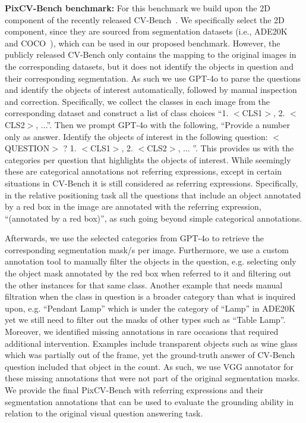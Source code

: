 \textbf{PixCV-Bench benchmark:} For this benchmark we build upon the 2D component of the recently released CV-Bench~\cite{tong2024cambrian}. We specifically select the 2D component, since they are sourced from segmentation datasets (i.e., ADE20K~\cite{zhou2017scene} and COCO~\cite{lin2014microsoft}), which can be used in our proposed benchmark. However, the publicly released CV-Bench only contains the mapping to the original images in the corresponding datasets, but it does not identify the objects in question and their corresponding segmentation. As such we use GPT-4o to parse the questions and identify the objects of interest automatically, followed by manual inspection and correction. Specifically, we collect the classes in each image from the corresponding dataset and construct a list of class choices ``1. $<$CLS1$>$, 2. $<$CLS2$>$, ...''. Then we prompt GPT-4o with the following, ``Provide a number only as answer. Identify the objects of interest in the following question: $<$QUESTION$>$ ? 1. $<$CLS1$>$, 2. $<$CLS2$>$, ... ''.  This provides us with the categories per question that highlights the objects of interest. While seemingly these are categorical annotations not referring expressions, except in certain situations in CV-Bench it is still considered as referring expressions. Specifically, in the relative positioning task all the questions that include an object annotated by a red box in the image are annotated with the referring expression, ``(annotated by a red box)'', as such going beyond simple categorical annotations.

Afterwards, we use the selected categories from GPT-4o to retrieve the corresponding segmentation mask/s per image. Furthermore, we use a custom annotation tool to manually filter the objects in the question, e.g. selecting only the object mask annotated by the red box when referred to it and filtering out the other instances for that same class. Another example that needs manual filtration when the class in question is a broader category than what is inquired upon, e.g. ``Pendant Lamp'' which is under the category of ``Lamp'' in ADE20K yet we still need to filter out the masks of other types such as ``Table Lamp''. Moreover, we identified missing annotations in rare occasions that required additional intervention. Examples include transparent objects such as wine glass which was partially out of the frame, yet the ground-truth answer of CV-Bench question included that object in the count. As such, we use VGG annotator for these missing annotations that were not part of the original segmentation masks. We provide the final PixCV-Bench with referring expressions and their segmentation annotations that can be used to evaluate the grounding ability in relation to the original visual question answering task.

